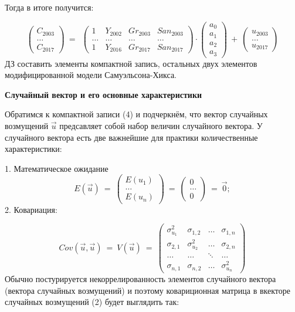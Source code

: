 \documentclass[12pt,a4paper]{article}
\begin{document}
Тогда в итоге получится:


\begin{equation*}
\begin{pmatrix}
C_{2003}\\
\dotsc \\
C_{2017}
\end{pmatrix} \ =\ \ \begin{pmatrix}
1 & Y_{2002} & Gr_{2003} & San_{2003}\\
\dotsc  & \dotsc  & \dotsc  & \dotsc \\
1 & Y_{2016} & Gr_{2017} & San_{2017}
\end{pmatrix} \cdot \begin{pmatrix}
a_{0}\\
a_{1}\\
a_{2}\\
a_{3}
\end{pmatrix} \ +\ \begin{pmatrix}
u_{2003}\\
\dotsc \\
u_{2017}
\end{pmatrix}
\end{equation*}
$\displaystyle \boxed{\text{ДЗ}}$ составить элементы компактной запись, остальных двух элементов модифицированной модели Самуэльсона-Хикса.

\textbf{Случайный вектор и его основные характеристики}

Обратимся к компактной записи (4) и подчеркнём, что вектор случайных возмущений $\displaystyle \vec{u}$ предсавляет собой набор величин случайного вектора. У случайного вектора есть две важнейшие для практики количественные характеристики:

	1. Математическое ожидание
\begin{equation*}
E\left(\vec{u}\right) \ =\ \begin{pmatrix}
E( u_{1})\\
\dotsc \\
E( u_{n})
\end{pmatrix} \ =\ \begin{pmatrix}
0\\
\dotsc \\
0
\end{pmatrix} \ =\ \vec{0} ;
\end{equation*}
	2. Ковариация:


\begin{equation*}
Cov\left(\vec{u} ,\vec{u}\right) \ =\ V\left(\vec{u}\right) \ =\ \begin{pmatrix}
\sigma_{u_{1}}^{2} & \sigma _{1,2} & \dotsc  & \sigma _{1,n}\\
\sigma_{2,1} & \sigma _{u_{2}}^{2} & \dotsc  & \sigma _{2,n}\\
\dotsc  & \dotsc  & \ddots  & \dotsc \\
\sigma _{n,1} & \sigma _{n,2} & \dotsc  & \sigma _{u_{n}}^{2}
\end{pmatrix}
\end{equation*}
Обычно постурируется некоррелированность элементов случайного вектора (вектора случайных возмущений) и поэтому ковариционная матрица в вкекторе случайных возмущений (2) будет выглядить так:
\end{document}
